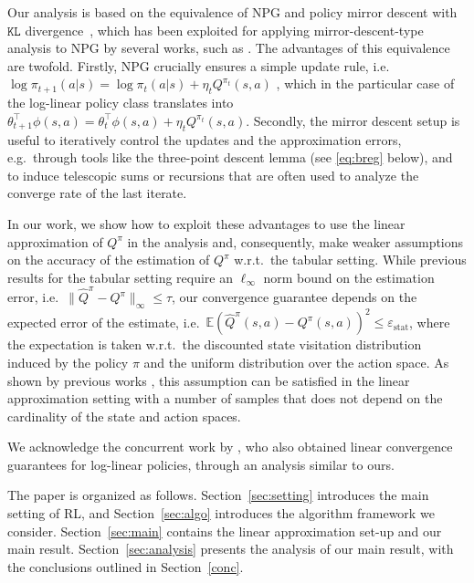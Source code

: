 \documentclass[a4paper,12pt]{article}
\numberwithin{theorem}{section}
\newcommand\E{\mathbb{E}}
\newcommand\A{\mathcal{A}}
\renewcommand\S{\mathcal{S}}
\newcommand\1{\mathbf{1}}
\newcommand\KL{\mathtt{KL}}
\begin{document}
Our analysis is based on the equivalence of NPG and policy mirror descent with $\KL$ divergence~\citep{RN184}, which has been exploited for applying mirror-descent-type analysis to NPG by several works, such as \cite{RN265,RN279, RN280}. The advantages of this equivalence are twofold.
Firstly, NPG crucially ensures a simple update rule, i.e.\ $\log\pi_{t+1}(a|s) = \log\pi_t(a|s) + \eta_tQ^{\pi_t}(s,a)$ , which in the particular case of the log-linear policy class translates into $\theta_{t+1}^\top\phi(s,a) = \theta_t^\top\phi(s,a) + \eta_tQ^{\pi_t}(s,a)$.
Secondly, the mirror descent setup is useful to iteratively control the updates and the approximation errors, e.g.\ through tools like the three-point descent lemma (see \eqref{eq:breg} below), and to induce telescopic sums or recursions that are often used to analyze the converge rate of the last iterate.

In our work, we show how to exploit these advantages to use the linear approximation of $Q^\pi$ in the analysis and, consequently, make weaker assumptions on the accuracy of the estimation of $Q^\pi$ w.r.t.\ the tabular setting. While previous results for the tabular setting \citep{RN150,RN242,RN266} require an $\ell_\infty$ norm bound on the estimation error, i.e.\ $\lVert \widehat{Q}^\pi-Q^\pi \rVert_\infty\leq\tau$,
our convergence guarantee depends on the expected error of the estimate, i.e.\ $\E (\widehat{Q}^\pi(s,a)-Q^\pi(s,a) )^2\leq\varepsilon_\text{stat}$, where the expectation is taken w.r.t.\ the discounted state visitation distribution induced by the policy $\pi$ and the uniform distribution over the action space. As shown by previous works \citep{bhandari2018finite}, this assumption can be satisfied in the linear approximation setting with a number of samples that does not depend on the cardinality of the state and action spaces.%

We acknowledge the concurrent work by \cite{yuan2023linear}, who also obtained linear convergence guarantees for log-linear policies, through an analysis similar to ours. 




The paper is organized as follows. Section~\ref{sec:setting} introduces the main setting of RL, and Section~\ref{sec:algo} introduces the algorithm framework we consider. Section~\ref{sec:main} contains the linear approximation set-up and our main result. Section~\ref{sec:analysis} presents the analysis of our main result, with the conclusions outlined in Section~\ref{conc}.
\end{document}
